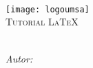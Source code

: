\begin{titlepage}
	\begin{center}		
		\textsc{\LARGE {\myUniversity}}\\[0.5cm] 
		\textsc{\Large{\myFaculty}}\\[0.5cm]
		\textsc{\large{\myDepartment}}\\[1cm]
		\texttt{[image: logoumsa]}\\[1cm] 
		\textsc{\LARGE Tutorial {\LaTeX}}\\[1.5cm]			
		{\Large \myTitle}\\[3cm]									
		\begin{minipage}{0.8\textwidth}
			\begin{flushleft} 
				\large\textit{Autor:}\quad\myAuthorName\\[0.5cm]
			\end{flushleft}
		\end{minipage}\\[3cm]		
		\the\year	
		\vfill
	\end{center}	
\end{titlepage}